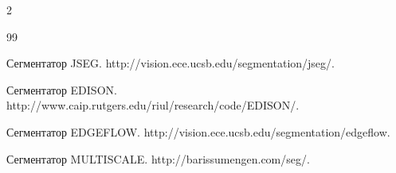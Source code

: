 \begin{multicols}{2}
{{\begin{thebibliography}{99}
  




  Сегментатор JSEG. {\sf http://vision.ece.ucsb.edu/\linebreak segmentation/jseg/}.


  


  \label{end\stat}


  




  Сегментатор EDISON. {\sf http://www.caip.rutgers.edu/\linebreak riul/research/code/EDISON/}.


  




  Сегментатор EDGEFLOW. {\sf http://vision.ece.ucsb.edu/\linebreak segmentation/edgeflow}.


  




  Сегментатор MULTISCALE. {\sf http://barissumengen.\linebreak com/seg/}.


 \end{thebibliography}


}


}








\end{multicols}       


